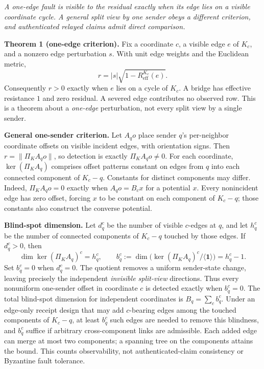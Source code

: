 \documentclass[11pt,a4paper]{article}
\newcommand{\onebreath}[1]{\begin{center}\emph{#1}\end{center}}
\begin{document}
\onebreath{A one-edge fault is visible to the residual exactly when its edge lies on a visible coordinate cycle. A general split view by one sender obeys a different criterion, and authenticated relayed claims admit direct comparison.}

\begin{thebox}
\textbf{Theorem 1 (one-edge criterion).} Fix a coordinate $c$, a visible edge $e$ of $K_c$, and a nonzero edge perturbation $s$. With unit edge weights and the Euclidean metric,
\[
r=|s|\sqrt{1-R_{\mathrm{eff}}^{K_c}(e)}.
\]
Consequently $r>0$ exactly when $e$ lies on a cycle of $K_c$. A bridge has effective resistance $1$ and zero residual. A severed edge contributes no observed row. This is a theorem about a \emph{one-edge} perturbation, not every split view by a single sender.

\textbf{General one-sender criterion.} Let $A_qo$ place sender $q$'s per-neighbor coordinate offsets on visible incident edges, with orientation signs. Then $r=\|\Pi_K A_qo\|$, so detection is exactly $\Pi_K A_qo\ne0$. For each coordinate, $\ker(\Pi_KA_q)$ comprises offset patterns constant on edges from $q$ into each connected component of $K_c-q$. Constants for distinct components may differ. Indeed, $\Pi_KA_qo=0$ exactly when $A_qo=B_cx$ for a potential $x$. Every nonincident edge has zero offset, forcing $x$ to be constant on each component of $K_c-q$; those constants also construct the converse potential.

\textbf{Blind-spot dimension.} Let $d_q^c$ be the number of visible $c$-edges at $q$, and let $h_q^c$ be the number of connected components of $K_c-q$ touched by those edges. If $d_q^c>0$, then
\[
\dim\ker(\Pi_KA_q)^c=h_q^c,\qquad
b_q^c:=\dim\bigl(\ker(\Pi_KA_q)^c/\langle\mathbf1\rangle\bigr)=h_q^c-1.
\]
Set $b_q^c=0$ when $d_q^c=0$. The quotient removes a uniform sender-state change, leaving precisely the independent \emph{invisible split-view} directions. Thus every nonuniform one-sender offset in coordinate $c$ is detected exactly when $b_q^c=0$. The total blind-spot dimension for independent coordinates is $B_q=\sum_c b_q^c$. Under an edge-only receipt design that may add $c$-bearing edges among the touched components of $K_c-q$, at least $b_q^c$ such edges are needed to remove this blindness, and $b_q^c$ suffice if arbitrary cross-component links are admissible. Each added edge can merge at most two components; a spanning tree on the components attains the bound. This counts observability, not authenticated-claim consistency or Byzantine fault tolerance.
\end{thebox}
\end{document}

